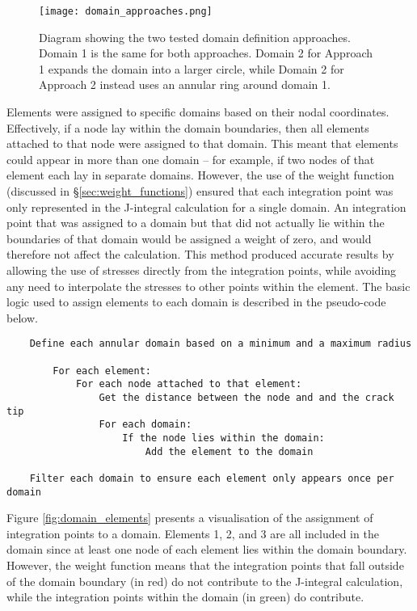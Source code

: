 \begin{figure}[H]
	\centering
	\texttt{[image: domain\_approaches.png]}
	\caption{Diagram showing the two tested domain definition approaches. Domain 1 is the same for both approaches. Domain 2 for Approach 1 expands the domain into a larger circle, while Domain 2 for Approach 2 instead uses an annular ring around domain 1.}
	\label{fig:domain_approaches}
\end{figure}

Elements were assigned to specific domains based on their nodal coordinates. Effectively, if a node lay within the domain boundaries, then all elements attached to that node were assigned to that domain. This meant that elements could appear in more than one domain -- for example, if two nodes of that element each lay in separate domains. However, the use of the weight function (discussed in \S\ref{sec:weight_functions}) ensured that each integration point was only represented in the J-integral calculation for a single domain. An integration point that was assigned to a domain but that did not actually lie within the boundaries of that domain would be assigned a weight of zero, and would therefore not affect the calculation. This method produced accurate results by allowing the use of stresses directly from the integration points, while avoiding any need to interpolate the stresses to other points within the element. The basic logic used to assign elements to each domain is described in the pseudo-code below.

\begin{verbatim}
	Define each annular domain based on a minimum and a maximum radius
	
	    For each element:
	        For each node attached to that element:
	            Get the distance between the node and and the crack tip
	            For each domain:
	                If the node lies within the domain:
	                    Add the element to the domain
	                    
	Filter each domain to ensure each element only appears once per domain	
\end{verbatim}

Figure \ref{fig:domain_elements} presents a visualisation of the assignment of integration points to a domain. Elements 1, 2, and 3 are all included in the domain since at least one node of each element lies within the domain boundary. However, the weight function means that the integration points that fall outside of the domain boundary (in red) do not contribute to the J-integral calculation, while the integration points within the domain (in green) do contribute.

